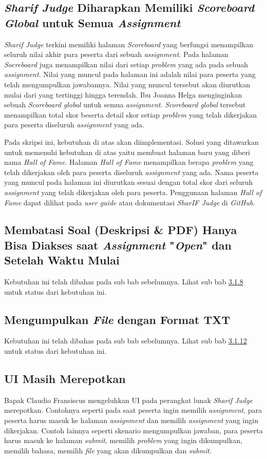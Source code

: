 \subsection{\textit{Sharif Judge} Diharapkan Memiliki \textit{Scoreboard Global} untuk Semua \textit{Assignment}}
\textit{Sharif Judge} terkini memiliki halaman \textit{Scoreboard} yang berfungsi menampilkan seluruh nilai akhir para peserta dari sebuah \textit{assignment}. Pada halaman \textit{Socreboard} juga menampilkan nilai dari setiap \textit{problem} yang ada pada sebuah \textit{assignment}. Nilai yang muncul pada halaman ini adalah nilai para peserta yang telah mengumpulkan jawabannya. Nilai yang muncul tersebut akan diurutkan mulai dari yang tertinggi hingga terendah. Ibu Joanna Helga menginginkan sebuah \textit{Scoreboard global} untuk semua \textit{assignment}. \textit{Scoreboard global} tersebut menampilkan total skor beserta detail skor setiap \textit{problem} yang telah dikerjakan para peserta diseluruh \textit{assignment} yang ada. 

Pada skripsi ini, kebutuhan di atas akan diimplementasi. Solusi yang ditawarkan untuk memenuhi kebutuhan di atas yaitu membuat halaman baru yang diberi nama \textit{Hall of Fame}. Halaman \textit{Hall of Fame} menampilkan berapa \textit{problem} yang telah dikerjakan oleh para peserta diseluruh \textit{assignment} yang ada. Nama peserta yang muncul pada halaman ini diurutkan sesuai dengan total skor dari seluruh \textit{assignment} yang telah dikerjakan oleh para peserta. Penggunaan halaman \textit{Hall of Fame} dapat dilihat pada \textit{user guide} atau dokumentasi \textit{SharIF Judge} di \textit{GitHub}.

\subsection{Membatasi Soal (Deskripsi \& PDF) Hanya Bisa Diakses saat \textit{Assignment} "\textit{Open}" dan Setelah Waktu Mulai}
Kebutuhan ini telah dibahas pada sub bab sebelumnya. Lihat sub bab \hyperref[subsec:membatasisoal]{3.1.8} untuk status dari kebutuhan ini.

\subsection{Mengumpulkan \textit{File} dengan Format TXT}
Kebutuhan ini telah dibahas pada sub bab sebelumnya. Lihat sub bab \hyperref[subsec:filetxt]{3.1.12} untuk status dari kebutuhan ini.

\subsection{UI Masih Merepotkan}
Bapak Claudio Fransiscus mengeluhkan UI pada perangkat lunak \textit{Sharif Judge} merepotkan. Contohnya seperti pada saat peserta ingin memilih \textit{assignment}, para peserta harus masuk ke halaman \textit{assignment} dan memilih \textit{assignment} yang ingin dikerjakan. Contoh lainnya seperti skenario mengumpulkan jawaban, para peserta harus masuk ke halaman \textit{submit}, memilih \textit{problem} yang ingin dikumpulkan, memilih bahasa, memilih \textit{file} yang akan dikumpulkan dan \textit{submit}.

